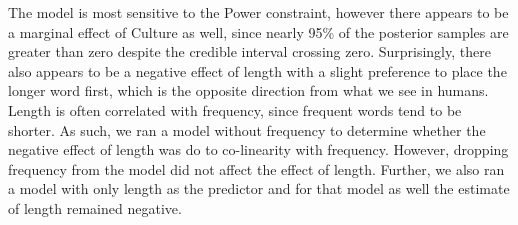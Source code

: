 \documentclass[
  12pt,
  letterpaper,
]{scrreport}
\begin{document}
\begin{table}

\caption{\label{tbl-exp1m2}Model results examining the effect of each
individual constraint on LogOdds(AandB).}


\end{table}%

The model is most sensitive to the Power constraint, however there
appears to be a marginal effect of Culture as well, since nearly 95\% of
the posterior samples are greater than zero despite the credible
interval crossing zero. Surprisingly, there also appears to be a
negative effect of length with a slight preference to place the longer
word first, which is the opposite direction from what we see in humans.
Length is often correlated with frequency, since frequent words tend to
be shorter. As such, we ran a model without frequency to determine
whether the negative effect of length was do to co-linearity with
frequency. However, dropping frequency from the model did not affect the
effect of length. Further, we also ran a model with only length as the
predictor and for that model as well the estimate of length remained
negative.
\end{document}
